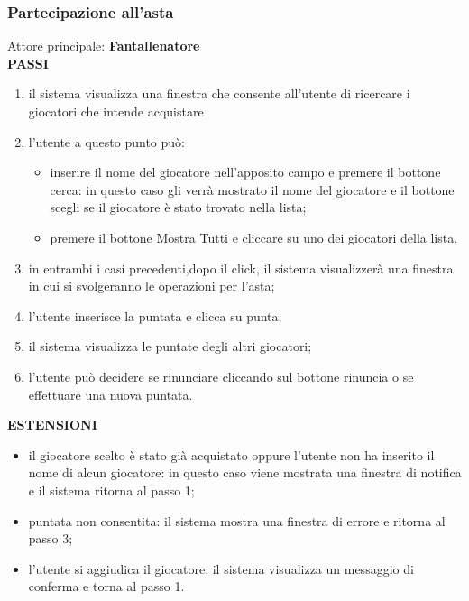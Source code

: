 \documentclass[12pt,a4paper]{article}
\begin{document}
\subsubsection{Partecipazione all'asta}
Attore principale: \textbf{Fantallenatore}\\
\newline
\textbf{PASSI}
\begin{enumerate}
\item il sistema visualizza una finestra che consente all'utente di ricercare i giocatori che intende acquistare
\item l'utente  a questo punto può:
\begin{itemize}
\item inserire il nome del giocatore nell'apposito campo e premere il bottone cerca: in questo caso gli verrà mostrato il nome del giocatore e il bottone scegli se il giocatore è stato trovato nella lista;
\item premere il bottone Mostra Tutti e cliccare su uno dei giocatori della lista.
\end{itemize}
\item in entrambi i casi precedenti,dopo il click, il sistema visualizzerà una finestra in cui si svolgeranno le operazioni per l'asta;
\item l'utente inserisce la puntata e clicca su punta;
\item il sistema visualizza le puntate degli altri giocatori;
\item l'utente può decidere se rinunciare cliccando sul bottone rinuncia o se effettuare una nuova puntata.
\end{enumerate}
\textbf{ESTENSIONI}
\begin{itemize}
\item il giocatore scelto è stato già acquistato oppure l'utente non ha inserito il nome di alcun giocatore: in questo caso viene mostrata una finestra di notifica e il sistema ritorna al passo 1;
\item puntata non consentita: il sistema mostra una finestra di errore e ritorna al passo 3;
\item l'utente si aggiudica il giocatore: il sistema visualizza un messaggio di conferma e torna al passo 1.
\end{itemize}
\end{document}
